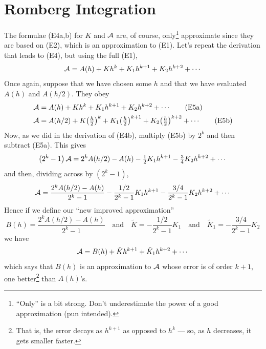 \section{Romberg Integration}
The formulae (E4a,b) for $K$ and $\mathcal{A}$ are,
of course, only\footnote{``Only'' is a bit strong. Don't underestimate the power
of a good approximation (pun intended).} approximate since
they are based on (E2), which is an approximation
to (E1). Let's repeat the derivation that leads to
(E4), but using the full (E1),
\begin{equation*}
\mathcal{A}=A(h)+Kh^k+K_1h^{k+1}+K_2h^{k+2}+\cdots
\end{equation*}
Once again, suppose that we have chosen some $h$ and that we have
evaluated $A(h)$ and $A(h/2)$. They obey
\begin{align*}
\mathcal{A}&=A(h)+Kh^k+K_1 h^{k+1}+K_2 h^{k+2}+\cdots \tag{E5a}\\
\mathcal{A}&=A(h/2)+K\big(\tfrac{h}{2}\big)^k
        +K_1\big(\tfrac{h}{2}\big)^{k+1}
        +K_2\big(\tfrac{h}{2}\big)^{k+2}+\cdots \tag{E5b}
\end{align*}
Now, as we did in the derivation of (E4b), multiply
(E5b) by $2^k$ and then
subtract (E5a). This gives
\begin{equation*}
\left(2^k-1\right)\mathcal{A}=2^kA(h/2)-A(h)-\tfrac{1}{2} K_1 h^{k+1}
                   -\tfrac{3}{4} K_2 h^{k+2}+\cdots
\end{equation*}
and then, dividing across by $\left(2^k-1\right)$,
\begin{equation*}
\mathcal{A}=\frac{2^kA(h/2)-A(h)}{2^k-1}-\frac{1/2}{2^k-1} K_1 h^{k+1}
                  -\frac{3/4}{2^k-1} K_2 h^{k+2}+\cdots
\end{equation*}
Hence if we define our ``new improved approximation''
\begin{equation*}
B(h)=\frac{2^kA(h/2)-A(h)}{2^k-1}\quad\text{and}\quad
\tilde K = -\frac{1/2}{2^k-1}K_1\quad\text{and}\quad
\tilde K_1 = -\frac{3/4}{2^k-1}K_2
\tag{E6}\end{equation*}
we have
\begin{equation*}%
\cA=B(h)+\tilde K h^{k+1}+\tilde K_1 h^{k+2}+\cdots
\end{equation*}
which says that $B(h)$ is an approximation to $\mathcal{A}$ whose error is of order $k+1$,
one better\footnote{That is, the error decays as $h^{k+1}$ as opposed to $h^k$
--- so, as $h$ decreases, it gets smaller faster.} than $A(h)$'s.

